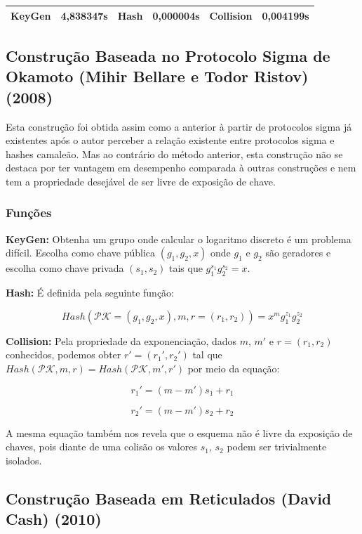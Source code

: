 \documentclass[a4paper]{article}
\begin{document}
\begin{center}
\begin{tabular}{|c|c|c|c|c|c|}
  \hline
  KeyGen & 4,838347s & Hash & 0,000004s & Collision & 0,004199s\\
  \hline
\end{tabular}
\end{center}

\subsection{Construção Baseada no Protocolo Sigma de Okamoto
  (Mihir Bellare e Todor Ristov) (2008)\cite{sigma}}

Esta construção foi obtida assim como a anterior à partir de
protocolos sigma já existentes após o autor perceber a relação
existente entre protocolos sigma e hashes camaleão. Mas ao contrário
do método anterior, esta construção não se destaca por ter vantagem em
desempenho comparada à outras construções e nem tem a propriedade
desejável de ser livre de exposição de chave.

\subsubsection{Funções}

\textbf{KeyGen: } Obtenha um grupo onde calcular o logaritmo discreto
é um problema difícil. Escolha como chave pública $(g_1, g_2, x)$ onde
$g_1$ e $g_2$ são geradores e escolha como chave privada $(s_1, s_2)$
tais que $g_1^{s_1}g_2^{s_2} = x$.

\textbf{Hash: } É definida pela seguinte função:

$$
Hash(\mathcal{PK}=(g_1, g_2, x), m, r=(r_1, r_2)) = x^mg_1^{z_1}g_2^{z_2}
$$

\textbf{Collision: } Pela propriedade da exponenciação, dados $m$,
$m'$ e $r=(r_1, r_2)$ conhecidos, podemos obter $r'=(r_1', r_2')$ tal
que $Hash(\mathcal{PK}, m, r) = Hash(\mathcal{PK}, m', r')$ por meio
da equação:

$$
r_1' = (m-m')s_1+r_1
$$

$$
r_2' = (m-m')s_2+r_2
$$

A mesma equação também nos revela que o esquema não é livre da
exposição de chaves, pois diante de uma colisão os valores $s_1$,
$s_2$ podem ser trivialmente isolados.

\subsection{Construção Baseada em Reticulados (David Cash)
  (2010)\cite{reticulado}}
\end{document}
